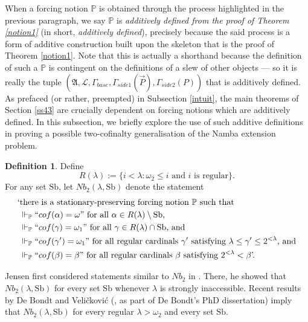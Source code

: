 \documentclass[12pt, twoside]{memoir}
\numberwithin{equation}{section}
\theoremstyle{definition}
\newtheorem{defi}[thm]{Definition}
\theoremstyle{remark}
\theoremstyle{definition}
\theoremstyle{definition}
\theoremstyle{definition}
\theoremstyle{remark}
\begin{document}
When a forcing notion $\mathbb{P}$ is obtained through the process highlighted in the previous paragraph, we say $\mathbb{P}$ is \textit{additively defined from the proof of Theorem \ref{notion1}} (in short, \textit{additively defined}), precisely because the said process is a form of additive construction built upon the skeleton that is the proof of Theorem \ref{notion1}. Note that this is actually a shorthand because the definition of such a $\mathbb{P}$ is contingent on the definitions of a slew of other objects --- so it is really the tuple $(\mathfrak{A}, \mathcal{L}, \Gamma_{base}, \Gamma_{side1}(\Vec{P}), \Gamma_{side2}(P))$ that is additively defined. As prefaced (or rather, preempted) in Subsection \ref{intuit}, the main theorems of Section \ref{ss43} are crucially dependent on forcing notions which are additively defined. In this subsection, we briefly explore the use of such additive definitions in proving a possible two-cofinalty generalisation of the Namba extension problem. 

\begin{defi}
Define 
\begin{equation*}
    R(\lambda) := \{i < \lambda : \omega_2 \leq i \text{ and } i \text{ is regular}\} \text{.}
\end{equation*}
For any set $\mathrm{Sb}$, let $Nb_2(\lambda, \mathrm{Sb})$ denote the statement
\begin{align*}
    \text{`} & \text{there is a stationary-preserving forcing notion } \mathbb{P} \text{ such that} \\ 
    & \Vdash_{\mathbb{P}} ``cof(\alpha) = \omega" \text{ for all } \alpha \in R(\lambda) \setminus \mathrm{Sb} \text{,} \\
    & \Vdash_{\mathbb{P}} ``cof(\gamma) = \omega_1" \text{ for all } \gamma \in R(\lambda) \cap \mathrm{Sb} \text{, and} \\
    & \Vdash_{\mathbb{P}} ``cof(\gamma') = \omega_1" \text{ for all regular cardinals } \gamma' \text{ satisfying } \lambda \leq \gamma' \leq 2^{< \lambda} \text{, and} \\
    & \Vdash_{\mathbb{P}} ``cof(\beta) = \beta" \text{ for all regular cardinals } \beta \text{ satisfying } 2^{< \lambda} < \beta \text{'.}
\end{align*}
\end{defi}

Jensen first considered statements similar to $Nb_2$ in \cite{lforcing}. There, he showed that $Nb_2(\lambda, \mathrm{Sb})$ for every set $\mathrm{Sb}$ whenever $\lambda$ is strongly inaccessible. Recent results by De Bondt and Veli\v{c}kovi\'{c} (\cite{bendb}, as part of De Bondt's PhD dissertation) imply that $Nb_2(\lambda, \mathrm{Sb})$ for every regular $\lambda > \omega_2$ and every set $\mathrm{Sb}$. 
\end{document}
